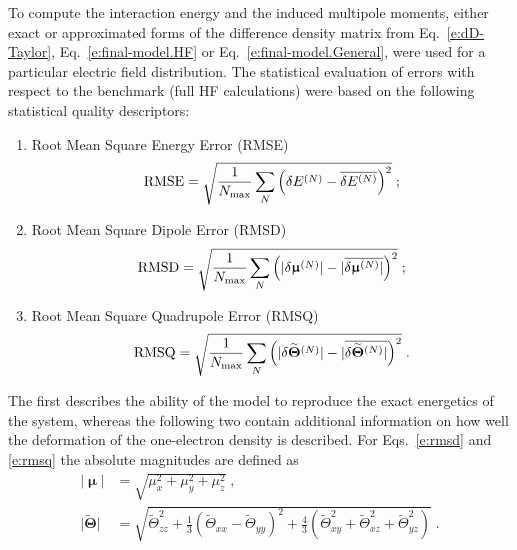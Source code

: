 \documentclass[aip,amsmath,amssymb,reprint,floatfix]{revtex4-1}
\newcommand{\BM}[1]{\bm{#1}}
\begin{document}
To compute the interaction energy and the induced multipole moments, either exact or approximated forms
of the difference density matrix from Eq.~\eqref{e:dD-Taylor}, Eq.~\eqref{e:final-model.HF} or Eq.~\eqref{e:final-model.General},
were used for a particular electric field distribution. The statistical evaluation of
errors with respect to the benchmark (full HF calculations) were based on 
the following statistical quality descriptors:
%
\begin{enumerate}
 \item Root Mean Square Energy Error (RMSE)
   \begin{equation}\label{e:rmse}
     {\rm RMSE} = \sqrt{ \frac{1}{N_{\rm max}} \sum_N \left( \delta E^{(N)} - \overline{\delta E^{(N)}}\right)^2 } \;;
   \end{equation}
 \item Root Mean Square Dipole Error (RMSD)
   \begin{equation}\label{e:rmsd}
     {\rm RMSD} = \sqrt{ \frac{1}{N_{\rm max}}\sum_N \left( \lvert \delta {\BM\upmu}^{(N)} \rvert 
                                             - \lvert \overline{\delta {\BM\upmu}^{(N)} \rvert }\right)^2 } \;;
   \end{equation}
 \item Root Mean Square Quadrupole Error (RMSQ)
   \begin{equation}\label{e:rmsq}
     {\rm RMSQ} = \sqrt{ \frac{1}{N_{\rm max}}\sum_N \left( \lvert \delta \widetilde{\BM\Theta}^{(N)} \rvert 
                                             - \lvert \overline{\delta \widetilde{\BM\Theta}^{(N)} \rvert }\right)^2 } \;.
   \end{equation}
\end{enumerate}
%
The first describes the ability of the model to reproduce the exact energetics of the system, 
whereas the following two contain additional information on how well the deformation of the one\hyp{}electron
density is described. For Eqs.~\eqref{e:rmsd} and \eqref{e:rmsq} the absolute magnitudes
are defined as
%
\begin{subequations}\label{e:absmagn}
  \begin{align}
   \lvert {\BM\upmu} \rvert &= \sqrt{\mu_x^2+\mu_y^2+\mu_z^2} \;,\\
   \lvert {\widetilde{\BM\Theta}}\rvert &= 
          \sqrt{\widetilde{\Theta}_{zz}^2 + \frac{1}{3}\left(\widetilde{\Theta}_{xx}-\widetilde{\Theta}_{yy}\right)^2 
          + \frac{4}{3}\left( \widetilde{\Theta}_{xy}^2 + \widetilde{\Theta}_{xz}^2 + \widetilde{\Theta}_{yz}^2 \right)} \;. 
  \end{align}
\end{subequations}
\end{document}

